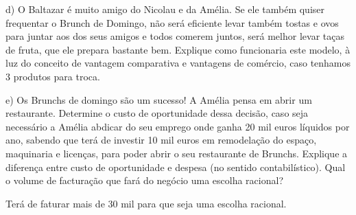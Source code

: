 \documentclass{beamer}
\begin{document}
\begin{frame}
    d) O Baltazar é muito amigo do Nicolau e da Amélia. Se ele também quiser
    frequentar o Brunch de Domingo, não será eficiente levar também tostas e ovos
    para juntar aos dos seus amigos e todos comerem juntos, será melhor levar taças
    de fruta, que ele prepara bastante bem. Explique como funcionaria este modelo,
    à luz do conceito de vantagem comparativa e vantagens de comércio, caso
    tenhamos 3 produtos para troca.

    \vspace{0.25in}

\end{frame}


\begin{frame}
    e) Os Brunchs de domingo são um sucesso! A Amélia pensa em abrir um
restaurante. Determine o custo de oportunidade dessa decisão, caso seja
necessário a Amélia abdicar do seu emprego onde ganha 20 mil euros líquidos
por ano, sabendo que terá de investir 10 mil euros em remodelação do espaço,
maquinaria e licenças, para poder abrir o seu restaurante de Brunchs. Explique a
diferença entre custo de oportunidade e despesa (no sentido contabilístico).
Qual o volume de facturação que fará do negócio uma escolha racional?

\vspace{0.25in}


Ter\'a de faturar mais de 30 mil para que seja uma escolha racional.

\end{frame}
\end{document}

